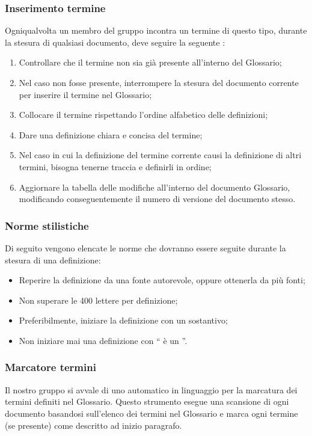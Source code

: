 \subsubsection{Inserimento termine}
\label{7.1}
Ogniqualvolta un membro del gruppo incontra un termine di questo tipo, durante la stesura di qualsiasi documento, deve seguire la seguente :
\begin{enumerate}
\item Controllare che il termine non sia già presente all'interno del Glossario;
\item Nel caso non fosse presente, interrompere la stesura del documento corrente per inserire il termine nel Glossario;
\item Collocare il termine rispettando l'ordine alfabetico delle definizioni;
\item Dare una definizione chiara e concisa del termine;
\item Nel caso in cui la definizione del termine corrente causi la definizione di altri termini, bisogna tenerne traccia e definirli in ordine;
\item Aggiornare la tabella delle modifiche all'interno del documento Glossario, modificando conseguentemente il numero di versione del documento stesso.
\end{enumerate}

\subsubsection{Norme stilistiche}
\label{7.2}
Di seguito vengono elencate le norme che dovranno essere seguite durante la stesura di una definizione:
\begin{itemize}
\item Reperire la definizione da una fonte autorevole, oppure ottenerla da più fonti;
\item Non superare le 400 lettere per definizione;
\item Preferibilmente, iniziare la definizione con un sostantivo;
\item Non iniziare mai una definizione con `` è un ''.
\end{itemize}

\subsubsection{Marcatore termini}
\label{7.3}
Il nostro gruppo si avvale di uno  automatico in linguaggio  per la marcatura dei termini definiti nel Glossario. Questo strumento esegue una scansione di ogni documento basandosi sull'elenco dei termini nel Glossario e marca ogni termine (se presente) come descritto ad inizio paragrafo.




